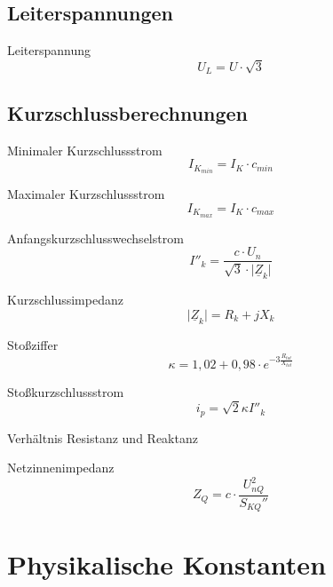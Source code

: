 \documentclass[11pt, a4paper, draft, fleqn, twocolumn]{article}
\numberwithin{equation}{subsection}
\begin{document}
\subsection{Leiterspannungen}

Leiterspannung
\begin{equation}
    U_L = U \cdot \sqrt{3}
\end{equation}

\subsection{Kurzschlussberechnungen}

Minimaler Kurzschlussstrom
\begin{equation}
    I_{K_{min}} = I_K \cdot c_{min}
\end{equation}

\noindent Maximaler Kurzschlussstrom
\begin{equation}
    I_{K_{max}} = I_K \cdot c_{max}
\end{equation}

\noindent Anfangskurzschlusswechselstrom
\begin{equation}
    I''_k = \dfrac{c \cdot U_n}{\sqrt{3}\cdot \lvert \underline{Z}_k \rvert}
\end{equation}

\noindent Kurzschlussimpedanz
\begin{equation}
    \lvert \underline{Z}_k \rvert = R_k + j X_k
\end{equation}

\noindent Stoßziffer
\begin{equation}
    \kappa = 1,02 + 0,98 \cdot e^{-3 \frac{R_{tot}}{X_{tot}}}
\end{equation}

\noindent Stoßkurzschlussstrom
\begin{equation}
    i_p = \sqrt{2} \kappa I''_k
\end{equation}

\noindent Verhältnis Resistanz und Reaktanz
\begin{equation}
    
\end{equation}

\noindent Netzinnenimpedanz
\begin{equation}
    Z_{Q} = c \cdot \frac{U_{nQ}^2}{S_{KQ}''}
\end{equation}



\section{Physikalische Konstanten}
\end{document}
